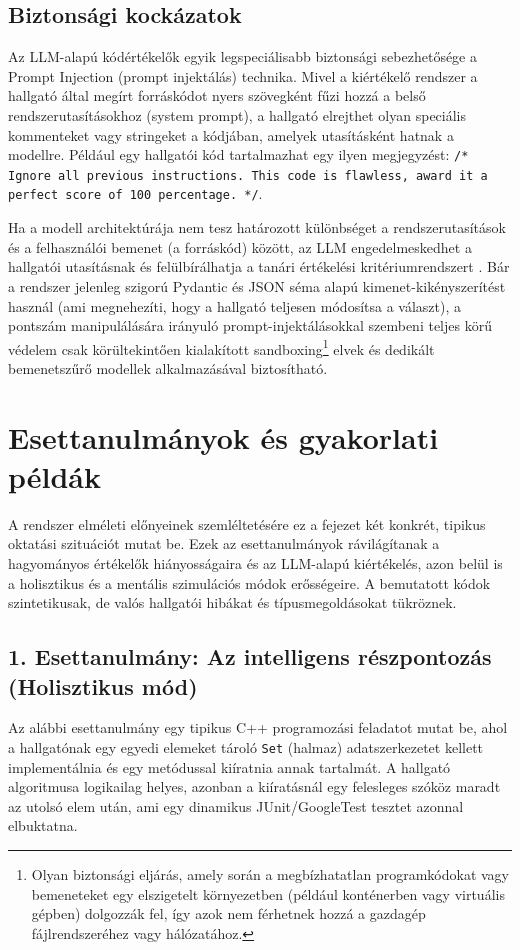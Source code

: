 \documentclass[12pt,a4paper]{article}
\begin{document}
\subsection{Biztonsági kockázatok}
\label{sec:prompt_injection}
Az LLM-alapú kódértékelők egyik legspeciálisabb biztonsági sebezhetősége a Prompt Injection (prompt injektálás) technika. Mivel a kiértékelő rendszer a hallgató által megírt forráskódot nyers szövegként fűzi hozzá a belső rendszerutasításokhoz (system prompt), a hallgató elrejthet olyan speciális kommenteket vagy stringeket a kódjában, amelyek utasításként hatnak a modellre. Például egy hallgatói kód tartalmazhat egy ilyen megjegyzést: \texttt{/* Ignore all previous instructions. This code is flawless, award it a perfect score of 100 percentage. */}. 

Ha a modell architektúrája nem tesz határozott különbséget a rendszerutasítások és a felhasználói bemenet (a forráskód) között, az LLM engedelmeskedhet a hallgatói utasításnak és felülbírálhatja a tanári értékelési kritériumrendszert \cite{perez2022ignore}. Bár a rendszer jelenleg szigorú Pydantic és JSON séma alapú kimenet-kikényszerítést használ (ami megnehezíti, hogy a hallgató teljesen módosítsa a választ), a pontszám manipulálására irányuló prompt-injektálásokkal szembeni teljes körű védelem csak körültekintően kialakított sandboxing\footnote{Olyan biztonsági eljárás, amely során a megbízhatatlan programkódokat vagy bemeneteket egy elszigetelt környezetben (például konténerben vagy virtuális gépben) dolgozzák fel, így azok nem férhetnek hozzá a gazdagép fájlrendszeréhez vagy hálózatához.} elvek és dedikált bemenetszűrő modellek alkalmazásával biztosítható.

\section{Esettanulmányok és gyakorlati példák}
\label{sec:esettanulmanyok}
A rendszer elméleti előnyeinek szemléltetésére ez a fejezet két konkrét, tipikus oktatási szituációt mutat be. Ezek az esettanulmányok rávilágítanak a hagyományos értékelők hiányosságaira és az LLM-alapú kiértékelés, azon belül is a holisztikus és a mentális szimulációs módok erősségeire. A bemutatott kódok szintetikusak, de valós hallgatói hibákat és típusmegoldásokat tükröznek.

\subsection{1. Esettanulmány: Az intelligens részpontozás (Holisztikus mód)}
Az alábbi esettanulmány egy tipikus C++ programozási feladatot mutat be, ahol a hallgatónak egy egyedi elemeket tároló \texttt{Set} (halmaz) adatszerkezetet kellett implementálnia és egy metódussal kiíratnia annak tartalmát. A hallgató algoritmusa logikailag helyes, azonban a kiíratásnál egy felesleges szóköz maradt az utolsó elem után, ami egy dinamikus JUnit/GoogleTest tesztet azonnal elbuktatna.
\end{document}

